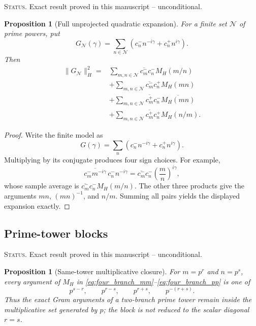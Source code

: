 \documentclass[11pt]{amsart}
\numberwithin{equation}{section}
\theoremstyle{plain}
\newtheorem{proposition}[theorem]{Proposition}
\theoremstyle{definition}
\theoremstyle{remark}
\newcommand{\1}{\mathbf{1}}
\newcommand{\statusnote}[1]{%
  \par\smallskip\noindent
  \begingroup\footnotesize\textsc{Status.} #1\endgroup
  \par\smallskip}
\begin{document}
\statusnote{Exact result proved in this manuscript -- unconditional.}
\begin{proposition}[Full unprojected quadratic expansion]
\label{prop:full_four_branch_expansion}
For a finite set $\mathcal N$ of prime powers, put
\begin{equation}
G_{\mathcal N}(\gamma)
=
\sum_{n\in\mathcal N}
\left(c_n^-n^{-i\gamma}+c_n^+n^{i\gamma}\right).
\label{eq:G_N_set}
\end{equation}
Then
\begin{align}
\|G_{\mathcal N}\|_H^2
={}&
\sum_{m,n\in\mathcal N}
\overline{c_m^-}c_n^-M_H(m/n)
\label{eq:four_branch_mm}
\\
&+
\sum_{m,n\in\mathcal N}
\overline{c_m^-}c_n^+M_H(mn)
\label{eq:four_branch_mp}
\\
&+
\sum_{m,n\in\mathcal N}
\overline{c_m^+}c_n^-\overline{M_H(mn)}
\label{eq:four_branch_pm}
\\
&+
\sum_{m,n\in\mathcal N}
\overline{c_m^+}c_n^+M_H(n/m).
\label{eq:four_branch_pp}
\end{align}
\end{proposition}

\begin{proof}
Write the finite model as
\begin{equation}
G(\gamma)
=
\sum_n\left(c_n^-n^{-i\gamma}+c_n^+n^{i\gamma}\right).
\label{eq:four_branch_G_definition}
\end{equation}
Multiplying by its conjugate produces four sign choices.  For example,
\begin{equation}
\overline{c_m^-m^{-i\gamma}}\,c_n^-n^{-i\gamma}
=
\overline{c_m^-}c_n^-
\left(\frac mn\right)^{i\gamma},
\label{eq:four_branch_minus_minus}
\end{equation}
whose sample average is
\(\overline{c_m^-}c_n^-M_H(m/n)\).  The other three products give the
arguments \(mn\), \((mn)^{-1}\), and \(n/m\).  Summing all pairs yields
the displayed expansion exactly.
\end{proof}

\subsection{Prime-tower blocks}
\label{subsec:prime_tower_blocks}

\statusnote{Exact result proved in this manuscript -- unconditional.}
\begin{proposition}[Same-tower multiplicative closure]
\label{prop:same_tower_resonance}
For $m=p^r$ and $n=p^s$, every argument of $M_H$ in
\eqref{eq:four_branch_mm}--\eqref{eq:four_branch_pp} is one of
\begin{equation}
p^{s-r},
\qquad
p^{r-s},
\qquad
p^{r+s},
\qquad
p^{-(r+s)}.
\label{eq:same_tower_arguments}
\end{equation}
Thus the exact Gram arguments of a two-branch prime tower remain inside
the multiplicative set generated by \(p\); the block is not reduced to the
scalar diagonal \(r=s\).
\end{proposition}
\end{document}
